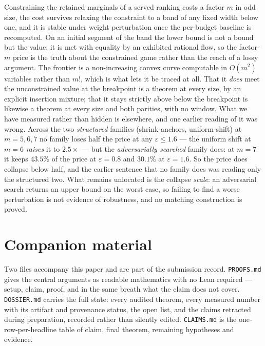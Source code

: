 Constraining the retained marginals of a served ranking costs a factor $m$ in odd size, the
cost survives relaxing the constraint to a band of any fixed width below one, and it is
stable under weight perturbation once the per-budget baseline is recomputed. On an initial
segment of the band the lower bound is not a bound but the value: it is met with equality by
an exhibited rational flow, so the factor-$m$ price is the truth about the constrained game
rather than the reach of a lossy argument. The frontier is
a non-increasing convex curve computable in $O(m^{2})$ variables rather than $m!$, which is
what lets it be traced at all. That it \emph{does} meet the unconstrained value at the
breakpoint is a theorem at every size, by an explicit insertion mixture; that it stays
strictly above below the breakpoint is likewise a theorem at every size and both parities,
with no window. What we have measured rather than hidden is elsewhere, and one earlier
reading of it was wrong. Across the two \emph{structured} families (shrink-anchors,
uniform-shift) at $m=5,6,7$ no family loses half the price at any
$\varepsilon\le1.6$ --- the uniform shift at $m=6$ \emph{raises} it to $2.5\times$ --- but
the \emph{adversarially searched} family does: at $m=7$ it keeps $43.5\%$ of the price at
$\varepsilon=0.8$ and $30.1\%$ at $\varepsilon=1.6$. So the price does collapse below half,
and the earlier sentence that no family does was reading only the structured two. What
remains unlocated is the collapse \emph{scale}: an adversarial search returns an upper
bound on the worst case, so failing to find a worse perturbation is not evidence of
robustness, and no matching construction is proved.

\section*{Companion material}
Two files accompany this paper and are part of the submission record.
\texttt{PROOFS.md} gives the central arguments as readable mathematics with no Lean
required --- setup, claim, proof, and in the same breath what the claim does not
cover. \texttt{DOSSIER.md} carries the full state: every audited theorem, every
measured number with its artifact and provenance status, the open list, and the
claims retracted during preparation, recorded rather than silently edited.
\texttt{CLAIMS.md} is the one-row-per-headline table of claim, final theorem,
remaining hypotheses and evidence.

